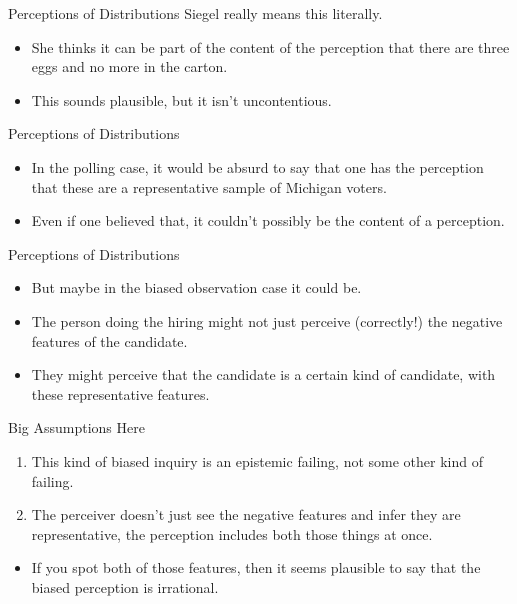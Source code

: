 \documentclass[
  17pt,
  letterpaper,
  ignorenonframetext,
  aspectratio=169,
  handout,
  xcolor={dvipsnames}]{beamer}
\providecommand{\tightlist}{%
  \setlength{\itemsep}{0pt}\setlength{\parskip}{0pt}}\usepackage{longtable,booktabs,array}
\begin{document}
\begin{frame}{Perceptions of Distributions}
\protect\hypertarget{perceptions-of-distributions-1}{}
Siegel really means this literally.

\begin{itemize}[<+->]
\tightlist
\item
  She thinks it can be part of the content of the perception that there
  are three eggs and no more in the carton.
\item
  This sounds plausible, but it isn't uncontentious.
\end{itemize}
\end{frame}

\begin{frame}{Perceptions of Distributions}
\protect\hypertarget{perceptions-of-distributions-2}{}
\begin{itemize}[<+->]
\tightlist
\item
  In the polling case, it would be absurd to say that one has the
  perception that these are a representative sample of Michigan voters.
\item
  Even if one believed that, it couldn't possibly be the content of a
  perception.
\end{itemize}
\end{frame}

\begin{frame}{Perceptions of Distributions}
\protect\hypertarget{perceptions-of-distributions-3}{}
\begin{itemize}[<+->]
\tightlist
\item
  But maybe in the biased observation case it could be.
\item
  The person doing the hiring might not just perceive (correctly!) the
  negative features of the candidate.
\item
  They might perceive that the candidate is a certain kind of candidate,
  with these representative features.
\end{itemize}
\end{frame}

\begin{frame}{Big Assumptions Here}
\protect\hypertarget{big-assumptions-here}{}
\begin{enumerate}[<+->]
\tightlist
\item
  This kind of biased inquiry is an epistemic failing, not some other
  kind of failing.
\item
  The perceiver doesn't just see the negative features and infer they
  are representative, the perception includes both those things at once.
\end{enumerate}

\begin{itemize}[<+->]
\tightlist
\item
  If you spot both of those features, then it seems plausible to say
  that the biased perception is irrational.
\end{itemize}
\end{frame}
\end{document}
